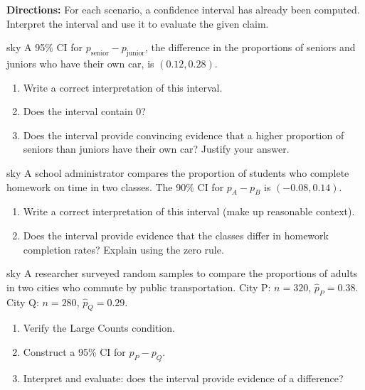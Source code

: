 \documentclass[10pt]{article}
\begin{document}
\namepartnerperiod

\vspace{0.15in}

\textbf{Directions:} For each scenario, a confidence interval has already been computed.
Interpret the interval and use it to evaluate the given claim.

\begin{scenariobox}{sky}
A 95\% CI for $p_{\text{senior}} - p_{\text{junior}}$, the difference in the proportions of
seniors and juniors who have their own car, is $(0.12, 0.28)$.

\begin{enumerate}[label=\arabic*.]
  \item Write a correct interpretation of this interval. 
  \item Does the interval contain 0? \blank{1.5cm}
  \item Does the interval provide convincing evidence that a higher proportion of seniors
        than juniors have their own car? Justify your answer. 
\end{enumerate}
\end{scenariobox}

\begin{scenariobox}{sky}
A school administrator compares the proportion of students who complete homework on time
in two classes. The 90\% CI for $p_A - p_B$ is $(-0.08, 0.14)$.

\begin{enumerate}[label=\arabic*.]
  \item Write a correct interpretation of this interval (make up reasonable context). 
  \item Does the interval provide evidence that the classes differ in homework completion rates?
        Explain using the zero rule. 
\end{enumerate}
\end{scenariobox}

\begin{scenariobox}{sky}
A researcher surveyed random samples to compare the proportions of adults in two cities
who commute by public transportation. City P: $n=320$, $\hat p_P=0.38$. City Q: $n=280$, $\hat p_Q=0.29$.

\begin{enumerate}[label=\arabic*.]
  \item Verify the Large Counts condition. 
  \item Construct a 95\% CI for $p_P - p_Q$. 
  \item Interpret and evaluate: does the interval provide evidence of a difference? 
\end{enumerate}
\end{scenariobox}
\end{document}
